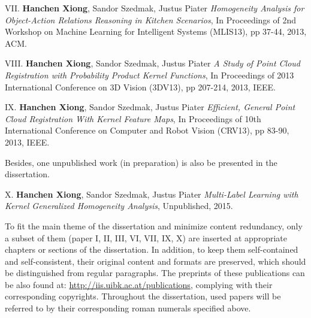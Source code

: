\begin{shaded}
{\Huge VII.} \textbf{Hanchen Xiong}, Sandor Szedmak, Justus Piater {\it Homogeneity Analysis for Object-Action Relations Reasoning in Kitchen Scenarios}, 
In Proceedings of 2nd Workshop on Machine Learning for Intelligent Systems (MLIS13), pp 37-44,  2013, ACM. 
\vspace{-.2cm}

  {\Huge VIII.} \textbf{Hanchen Xiong}, Sandor Szedmak, Justus Piater {\it A Study of Point Cloud Registration with Probability Product Kernel Functions}, 
In Proceedings of 2013 International Conference on 3D Vision (3DV13), pp 207-214,  2013, IEEE.
\vspace{-.2cm}

 {\Huge IX.} \textbf{Hanchen Xiong}, Sandor Szedmak, Justus Piater {\it Efficient, General Point Cloud Registration With Kernel Feature Maps}, 
In Proceedings of 10th International Conference on Computer and Robot Vision (CRV13), pp 83-90, 2013, IEEE.

\vspace{-.2cm}
\end{shaded}

Besides, one unpublished work (in preparation) is also be presented in the dissertation.   
\begin{shaded}
 {\Huge X.} \textbf{Hanchen Xiong}, Sandor Szedmak, Justus Piater {\it Multi-Label Learning with Kernel Generalized Homogeneity Analysis}, 
Unpublished, 2015.
\end{shaded}
To fit the main theme of the dissertation and minimize content redundancy, only a subset of them (paper I, II, III, VI, VII, IX, X) are inserted at appropriate chapters or 
sections of the dissertation. 
In addition, to keep them self-contained and self-consistent,     
their original content and formats are preserved,   
which should be distinguished from regular paragraphs. The preprints of these publications can be also found at: \url{http://iis.uibk.ac.at/publications}, 
complying with their corresponding copyrights. 
Throughout the dissertation, used papers will be referred to by their corresponding roman numerals specified above. 

